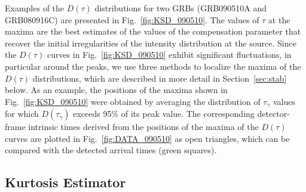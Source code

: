 \documentclass[12pt]{article}
\begin{document}
{Examples of the $D(\tau )$ distributions for two GRBs (GRB090510A and GRB080916C) are presented in Fig.~\ref{fig:KSD_090510}.
The values of $\tau $ at the maxima are the best estimates of the values
of the compensation parameter that recover the initial irregularities
of the intensity distribution at the source. Since the $D(\tau )$ curves in Fig.~\ref{fig:KSD_090510}
exhibit significant fluctuations, in particular around the peaks, we use three methods to localize the
maxima of the $D(\tau )$ distributions, which are described in more detail in Section~\ref{sec:stab} below.
As an example, the positions of the maxima shown in Fig.~\ref{fig:KSD_090510} were obtained by averaging the distribution
of $\tau_\gamma$ values for which $D(\tau_\gamma)$ exceeds 95\% of its peak value.
The corresponding detector-frame intrinsic times derived from the
positions of the maxima of the $D(\tau )$ curves are plotted in Fig.~\ref{fig:DATA_090510} as open triangles, which
can be compared with the detected arrival times (green squares).

\subsection{Kurtosis Estimator}
\label{sec:kurt}

}
\end{document}
